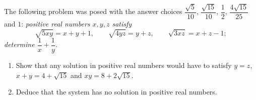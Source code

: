 The following problem was posed with the answer choices $\dfrac{\sqrt5}{10}$, $\dfrac{\sqrt{15}}{10}$, $\dfrac{1}{2}$, $\dfrac{4\sqrt{15}}{25}$ and $1$: \emph{positive real numbers $x,y,z$ satisfy}
\[\sqrt{5xy}=x+y+1,\qquad\sqrt{4yz}=y+z,\qquad\sqrt{3xz}=x+z-1;\]
\emph{determine $\dfrac{1}{x}+\dfrac{1}{y}$.}
\begin{enumerate}
\item[(a)] Show that any solution in positive real numbers would have to satisfy $y=z$, $x+y=4+\sqrt{15}$ and $xy=8+2\sqrt{15}$.
\item[(b)] Deduce that the system has no solution in positive real numbers.
\end{enumerate}
